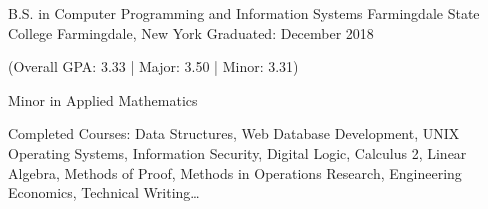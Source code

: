 

\begin{cventries}

  \cventry
    {B.S. in Computer Programming and Information Systems} %
    {Farmingdale State College} %
    {Farmingdale, New York} %
    {Graduated: December 2018} %
    {
      \begin{cvitems} %
        \item {(Overall GPA: 3.33 | Major: 3.50 | Minor: 3.31)}
        \item Minor in Applied Mathematics
        \item Completed Courses: Data Structures, Web Database Development, UNIX Operating Systems, Information Security, Digital Logic, Calculus 2, Linear Algebra, Methods of Proof, Methods in Operations Research, Engineering Economics, Technical Writing…
      \end{cvitems}
    }

\end{cventries}
